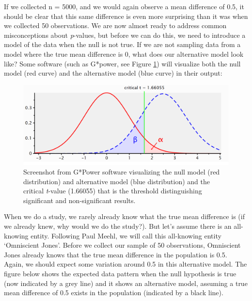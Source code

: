\documentclass[
  oneside]{krantz}
\begin{document}
If we collected n = 5000, and we would again observe a mean difference of 0.5, it should be clear that this same difference is even more surprising than it was when we collected 50 observations. We are now almost ready to address common misconceptions about \emph{p}-values, but before we can do this, we need to introduce a model of the data when the null is not true. If we are not sampling data from a model where the true mean difference is 0, what does our alternative model look like? Some software (such as G*power, see Figure \ref{fig:gpowerscreenshot}) will visualize both the null model (red curve) and the alternative model (blue curve) in their output:



\begin{figure}

{\centering \includegraphics[width=1\linewidth]{images/1.3.3} 

}

\caption{Screenshot from G*Power software visualizing the null model (red distribution) and alternative model (blue distribution) and the critical \emph{t}-value (1.66055) that is the threshold distinguishing significant and non-significant results.}\label{fig:gpowerscreenshot}
\end{figure}

When we do a study, we rarely already know what the true mean difference is (if we already knew, why would we do the study?). But let's assume there is an all-knowing entity. Following Paul Meehl, we will call this all-knowing entity `Omniscient Jones'. Before we collect our sample of 50 observations, Omniscient Jones already knows that the true mean difference in the population is 0.5. Again, we should expect some variation around 0.5 in this alternative model. The figure below shows the expected data pattern when the null hypothesis is true (now indicated by a grey line) and it shows an alternative model, assuming a true mean difference of 0.5 exists in the population (indicated by a black line).
\end{document}
